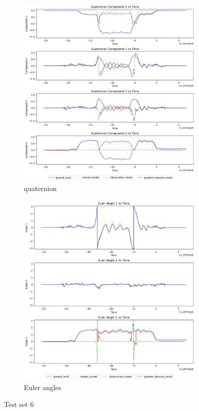 \documentclass[conference]{IEEEtran}
\begin{document}
\begin{figure}[h]
    \centering
    \begin{subfigure}{0.4\textwidth}
        \includegraphics[width=\linewidth]{../img/6_qt.png}
        \caption{quaternion}
    \end{subfigure}
    \hfill
    \begin{subfigure}{0.4\textwidth}
        \includegraphics[width=\linewidth]{../img/6_ea.png}
        \caption{Euler angles}
    \end{subfigure}
    \caption{Test set 6}
    \label{fig:set6}
\end{figure}
\end{document}
